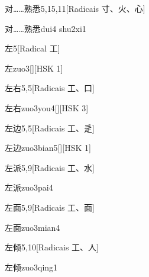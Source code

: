 \begin{entry}{对……熟悉}{5,15,11}[Radicais ⼨、⽕、⼼]
  \begin{phonetics}{对……熟悉}{dui4 shu2xi1}
  \end{phonetics}
\end{entry}

\begin{entry}{左}{5}[Radical ⼯]
  \begin{phonetics}{左}{zuo3}[][HSK 1]
  \end{phonetics}
\end{entry}

\begin{entry}{左右}{5,5}[Radicais ⼯、⼝]
  \begin{phonetics}{左右}{zuo3you4}[][HSK 3]
  \end{phonetics}
\end{entry}

\begin{entry}{左边}{5,5}[Radicais ⼯、⾡]
  \begin{phonetics}{左边}{zuo3bian5}[][HSK 1]
  \end{phonetics}
\end{entry}

\begin{entry}{左派}{5,9}[Radicais ⼯、⽔]
  \begin{phonetics}{左派}{zuo3pai4}
  \end{phonetics}
\end{entry}

\begin{entry}{左面}{5,9}[Radicais ⼯、⾯]
  \begin{phonetics}{左面}{zuo3mian4}
  \end{phonetics}
\end{entry}

\begin{entry}{左倾}{5,10}[Radicais ⼯、⼈]
  \begin{phonetics}{左倾}{zuo3qing1}
  \end{phonetics}
\end{entry}

